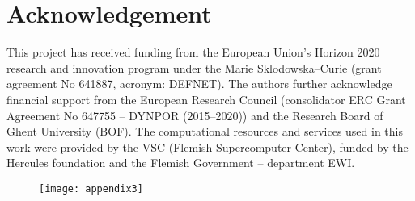 \renewcommand\evenpagerightmark{{\scshape\small Acknowledgement}}
\graphicspath{{figures/}}
\chapter{Acknowledgement}


This project has received funding from the European Union’s Horizon 2020 research and innovation program under the Marie Sklodowska--Curie (grant agreement No 641887, acronym: DEFNET). The authors further acknowledge financial support from the European Research Council (consolidator ERC Grant Agreement No 647755 -- DYNPOR (2015--2020)) and the Research Board of Ghent University (BOF).
\npar
\noindent The computational resources and services used in this work were provided by the VSC (Flemish Supercomputer Center), funded by the Hercules foundation and the Flemish Government -- department EWI.

\begin{figure}[!h]
	\centering
	\texttt{[image: appendix3]}
		\label{fig:appendix3}
\end{figure}